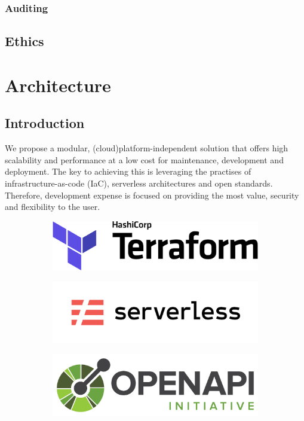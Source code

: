 \documentclass[10pt]{article}
\begin{document}
\subsubsection{Auditing}

\subsection{Ethics}

\newpage
\section{Architecture}
\subsection{Introduction}
We propose a modular, (cloud)platform-independent solution that offers high scalability and performance at a low cost for maintenance, development and deployment. The key to achieving this is leveraging the practises of infrastructure-as-code (IaC), serverless architectures and open standards. Therefore, development expense is focused on providing the most value, security and flexibility to the user.\\

\begin{figure}[h!]
	\centering
	\begin{subfigure}{0.25\linewidth}
		\includegraphics[width=\linewidth]{images/Terraform.png}
	\end{subfigure}
	\begin{subfigure}{0.25\linewidth}
		\includegraphics[width=\linewidth]{images/Serverless.png}
	\end{subfigure}
	\begin{subfigure}{0.25\linewidth}
		\includegraphics[width=\linewidth]{images/OpenAPI.png}
	\end{subfigure}
\end{figure}
\end{document}
